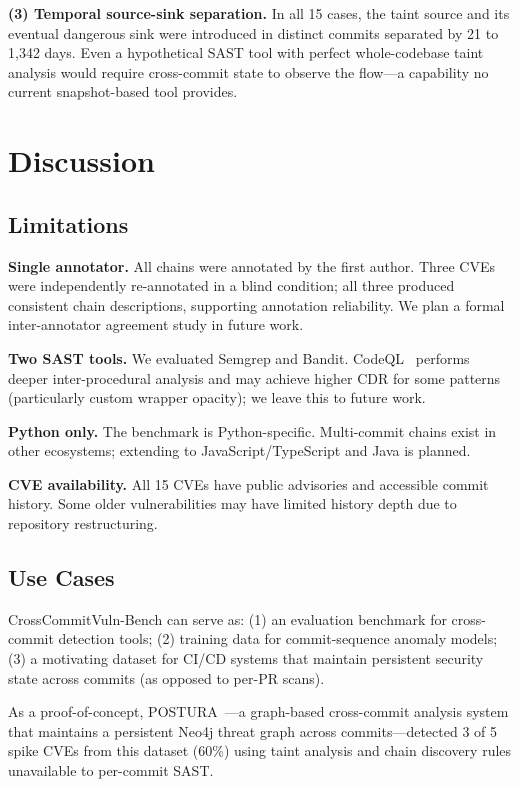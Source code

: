 \documentclass[sigconf,review]{acmart}
\newcommand{\NUMCVES}{15}
\begin{document}
\textbf{(3) Temporal source-sink separation.} In all \NUMCVES{} cases, the taint source and
its eventual dangerous sink were introduced in distinct commits separated by 21 to 1,342 days.
Even a hypothetical SAST tool with perfect whole-codebase taint analysis would require
cross-commit state to observe the flow—a capability no current snapshot-based tool provides.

\section{Discussion}

\subsection{Limitations}

\textbf{Single annotator.} All chains were annotated by the first author. Three CVEs were
independently re-annotated in a blind condition; all three produced consistent chain
descriptions, supporting annotation reliability. We plan a formal inter-annotator agreement
study in future work.

\textbf{Two SAST tools.} We evaluated Semgrep and Bandit. CodeQL~\cite{codeql} performs
deeper inter-procedural analysis and may achieve higher CDR for some patterns (particularly
custom wrapper opacity); we leave this to future work.

\textbf{Python only.} The benchmark is Python-specific. Multi-commit chains exist in other
ecosystems; extending to JavaScript/TypeScript and Java is planned.

\textbf{CVE availability.} All 15 CVEs have public advisories and accessible commit history.
Some older vulnerabilities may have limited history depth due to repository restructuring.

\subsection{Use Cases}

CrossCommitVuln-Bench can serve as:
(1) an evaluation benchmark for cross-commit detection tools;
(2) training data for commit-sequence anomaly models;
(3) a motivating dataset for CI/CD systems that maintain persistent security state
    across commits (as opposed to per-PR scans).

As a proof-of-concept, POSTURA~\cite{postura}—a graph-based cross-commit analysis system
that maintains a persistent Neo4j threat graph across commits—detected 3 of 5 spike CVEs
from this dataset (60\%) using taint analysis and chain discovery rules unavailable
to per-commit SAST.
\end{document}

